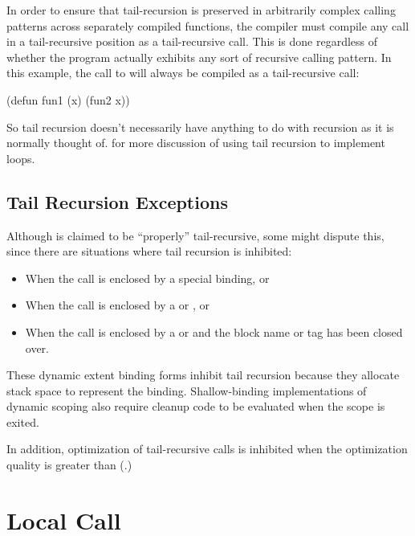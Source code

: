 In order to ensure that tail-recursion is preserved in arbitrarily
complex calling patterns across separately compiled functions, the
compiler must compile any call in a tail-recursive position as a
tail-recursive call.  This is done regardless of whether the program
actually exhibits any sort of recursive calling pattern.  In this
example, the call to  will always be compiled as a
tail-recursive call:

\begin{lisp}
(defun fun1 (x)
  (fun2 x))
\end{lisp}

So tail recursion doesn't necessarily have anything to do with recursion
as it is normally thought of.   for more
discussion of using tail recursion to implement loops.


\subsection{Tail Recursion Exceptions}

Although \python{} is claimed to be ``properly'' tail-recursive, some
might dispute this, since there are situations where tail recursion is
inhibited:
\begin{itemize}
  
\item When the call is enclosed by a special binding, or
  
\item When the call is enclosed by a  or
  , or
  
\item When the call is enclosed by a  or 
  and the block name or  tag has been closed over.
\end{itemize}
These dynamic extent binding forms inhibit tail recursion because they
allocate stack space to represent the binding.  Shallow-binding
implementations of dynamic scoping also require cleanup code to be
evaluated when the scope is exited.

In addition, optimization of tail-recursive calls is inhibited when
the  optimization quality is greater than 
(.)


\section{Local Call}
\label{local-call}

